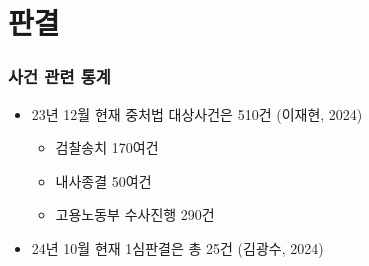 \documentclass[aspectratio=169,xcolor=dvipsnames,handout]{beamer}
\begin{document}
\section{판결}
\begin{frame}
    \frametitle{사건 관련 통계}
    \begin{itemize}[<+->]
        \item 23년 12월 현재 중처법 대상사건은 510건 (이재현, 2024)
            \begin{itemize}[<+->]
                \item 검찰송치 170여건
                \item 내사종결 50여건
                \item 고용노동부 수사진행 290건
            \end{itemize}
        \item 24년 10월 현재 1심판결은 총 25건 (김광수, 2024)
        \end{itemize}
\end{frame}
\end{document}
